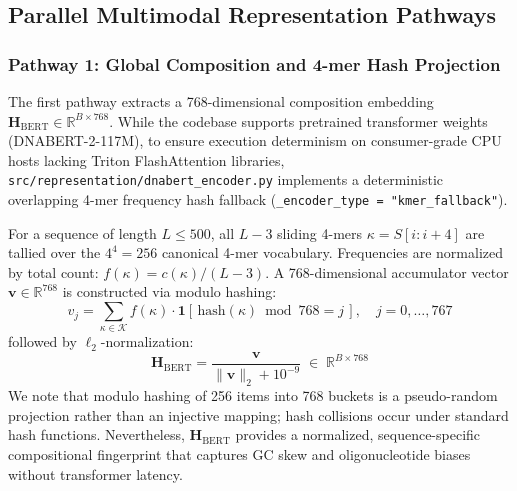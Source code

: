 \documentclass[conference]{IEEEtran}
\begin{document}
\subsection{Parallel Multimodal Representation Pathways}
\label{sec:pathways}

\subsubsection{Pathway 1: Global Composition and 4-mer Hash Projection}
The first pathway extracts a 768-dimensional composition embedding $\mathbf{H}_{\text{BERT}} \in \mathbb{R}^{B \times 768}$. While the codebase supports pretrained transformer weights (DNABERT-2-117M), to ensure execution determinism on consumer-grade CPU hosts lacking Triton FlashAttention libraries, \texttt{src/representation/dnabert_encoder.py} implements a deterministic overlapping 4-mer frequency hash fallback (\texttt{\_encoder\_type = "kmer\_fallback"}). 

For a sequence of length $L \le 500$, all $L-3$ sliding 4-mers $\kappa = S[i:i+4]$ are tallied over the $4^4 = 256$ canonical 4-mer vocabulary. Frequencies are normalized by total count: $f(\kappa) = c(\kappa)/(L-3)$. A 768-dimensional accumulator vector $\mathbf{v} \in \mathbb{R}^{768}$ is constructed via modulo hashing:
\begin{equation}
    v_j = \sum_{\kappa \in \mathcal{K}} f(\kappa) \cdot \mathbf{1}\left[\, \mathrm{hash}(\kappa) \bmod 768 = j \,\right], \quad j = 0, \ldots, 767
    \label{eq:kmer_hash}
\end{equation}
followed by $\ell_2$-normalization:
\begin{equation}
    \mathbf{H}_{\text{BERT}} = \frac{\mathbf{v}}{\|\mathbf{v}\|_2 + 10^{-9}} \;\in\; \mathbb{R}^{B \times 768}
    \label{eq:bert_embed}
\end{equation}
We note that modulo hashing of 256 items into 768 buckets is a pseudo-random projection rather than an injective mapping; hash collisions occur under standard hash functions. Nevertheless, $\mathbf{H}_{\text{BERT}}$ provides a normalized, sequence-specific compositional fingerprint that captures GC skew and oligonucleotide biases without transformer latency.
\end{document}
